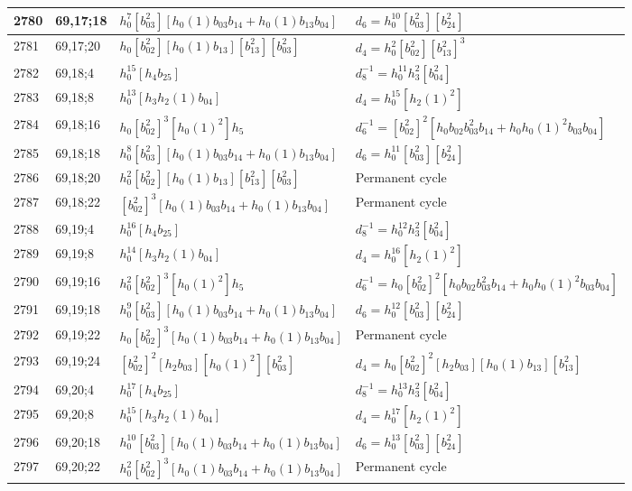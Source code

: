 \documentclass{article}
\begin{document}
\begin{longtable}{|l|l|>{\raggedright\arraybackslash}p{6cm}|>{\raggedright\arraybackslash}p{6cm}|}
\hline
2780 & 69,17;18 & $h_0^7[b_{03}^2][h_0(1)b_{03}b_{14} + h_0(1)b_{13}b_{04}]$ &$d_{6}=h_0^{10}[b_{03}^2][b_{24}^2]$\\
\hline
2781 & 69,17;20 & $h_0[b_{02}^2][h_0(1)b_{13}][b_{13}^2][b_{03}^2]$ &$d_{4}=h_0^2[b_{02}^2][b_{13}^2]^3$\\
\hline
2782 & 69,18;4 & $h_0^{15}[h_4b_{25}]$ & $d_{8}^{-1}=h_0^{11}h_3^2[b_{04}^2]$\\
\hline
2783 & 69,18;8 & $h_0^{13}[h_3h_2(1)b_{04}]$ &$d_{4}=h_0^{15}[h_2(1)^2]$\\
\hline
2784 & 69,18;16 & $h_0[b_{02}^2]^3[h_0(1)^2]h_5$ & $d_{6}^{-1}=[b_{02}^2]^2[h_0b_{02}b_{03}^2b_{14} + h_0h_0(1)^2b_{03}b_{04}]$\\
\hline
2785 & 69,18;18 & $h_0^8[b_{03}^2][h_0(1)b_{03}b_{14} + h_0(1)b_{13}b_{04}]$ &$d_{6}=h_0^{11}[b_{03}^2][b_{24}^2]$\\
\hline
2786 & 69,18;20 & $h_0^2[b_{02}^2][h_0(1)b_{13}][b_{13}^2][b_{03}^2]$ & Permanent cycle\\
\hline
2787 & 69,18;22 & $[b_{02}^2]^3[h_0(1)b_{03}b_{14} + h_0(1)b_{13}b_{04}]$ & Permanent cycle\\
\hline
2788 & 69,19;4 & $h_0^{16}[h_4b_{25}]$ & $d_{8}^{-1}=h_0^{12}h_3^2[b_{04}^2]$\\
\hline
2789 & 69,19;8 & $h_0^{14}[h_3h_2(1)b_{04}]$ &$d_{4}=h_0^{16}[h_2(1)^2]$\\
\hline
2790 & 69,19;16 & $h_0^2[b_{02}^2]^3[h_0(1)^2]h_5$ & $d_{6}^{-1}=h_0[b_{02}^2]^2[h_0b_{02}b_{03}^2b_{14} + h_0h_0(1)^2b_{03}b_{04}]$\\
\hline
2791 & 69,19;18 & $h_0^9[b_{03}^2][h_0(1)b_{03}b_{14} + h_0(1)b_{13}b_{04}]$ &$d_{6}=h_0^{12}[b_{03}^2][b_{24}^2]$\\
\hline
2792 & 69,19;22 & $h_0[b_{02}^2]^3[h_0(1)b_{03}b_{14} + h_0(1)b_{13}b_{04}]$ & Permanent cycle\\
\hline
2793 & 69,19;24 & $[b_{02}^2]^2[h_2b_{03}][h_0(1)^2][b_{03}^2]$ &$d_{4}=h_0[b_{02}^2]^2[h_2b_{03}][h_0(1)b_{13}][b_{13}^2]$\\
\hline
2794 & 69,20;4 & $h_0^{17}[h_4b_{25}]$ & $d_{8}^{-1}=h_0^{13}h_3^2[b_{04}^2]$\\
\hline
2795 & 69,20;8 & $h_0^{15}[h_3h_2(1)b_{04}]$ &$d_{4}=h_0^{17}[h_2(1)^2]$\\
\hline
2796 & 69,20;18 & $h_0^{10}[b_{03}^2][h_0(1)b_{03}b_{14} + h_0(1)b_{13}b_{04}]$ &$d_{6}=h_0^{13}[b_{03}^2][b_{24}^2]$\\
\hline
2797 & 69,20;22 & $h_0^2[b_{02}^2]^3[h_0(1)b_{03}b_{14} + h_0(1)b_{13}b_{04}]$ & Permanent cycle\\

\end{longtable}
\end{document}
